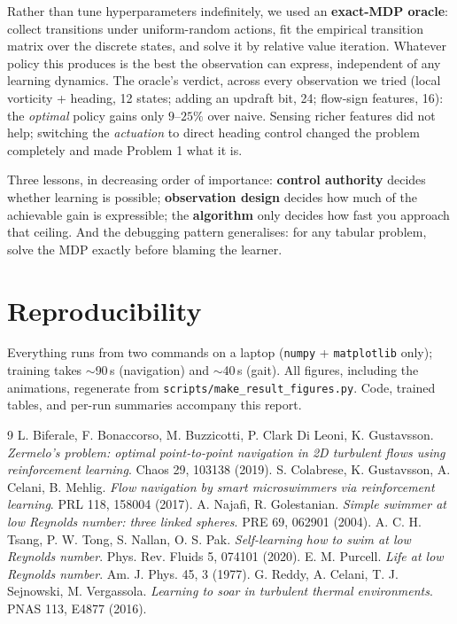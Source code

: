 \documentclass[11pt]{article}
\begin{document}
Rather than tune hyperparameters indefinitely, we used an \textbf{exact-MDP oracle}:
collect transitions under uniform-random actions, fit the empirical transition matrix
over the discrete states, and solve it by relative value iteration. Whatever policy this
produces is the best the observation can express, independent of any learning dynamics.
The oracle's verdict, across every observation we tried (local vorticity + heading, 12
states; adding an updraft bit, 24; flow-sign features, 16): the \emph{optimal} policy
gains only $9$--$25\%$ over naive. Sensing richer features did not help; switching the
\emph{actuation} to direct heading control changed the problem completely and made
Problem 1 what it is.

Three lessons, in decreasing order of importance: \textbf{control authority} decides
whether learning is possible; \textbf{observation design} decides how much of the
achievable gain is expressible; the \textbf{algorithm} only decides how fast you approach
that ceiling. And the debugging pattern generalises: for any tabular problem, solve the
MDP exactly before blaming the learner.

\section{Reproducibility}

Everything runs from two commands on a laptop (\texttt{numpy} + \texttt{matplotlib}
only); training takes $\sim$90\,s (navigation) and $\sim$40\,s (gait). All figures,
including the animations, regenerate from \texttt{scripts/make\_result\_figures.py}.
Code, trained tables, and per-run summaries accompany this report.

\begin{thebibliography}{9}
 L. Biferale, F. Bonaccorso, M. Buzzicotti, P. Clark Di Leoni,
K. Gustavsson. \emph{Zermelo's problem: optimal point-to-point navigation in 2D
turbulent flows using reinforcement learning}. Chaos 29, 103138 (2019).
 S. Colabrese, K. Gustavsson, A. Celani, B. Mehlig. \emph{Flow
navigation by smart microswimmers via reinforcement learning}. PRL 118, 158004 (2017).
 A. Najafi, R. Golestanian. \emph{Simple swimmer at low Reynolds number:
three linked spheres}. PRE 69, 062901 (2004).
 A. C. H. Tsang, P. W. Tong, S. Nallan, O. S. Pak. \emph{Self-learning
how to swim at low Reynolds number}. Phys. Rev. Fluids 5, 074101 (2020).
 E. M. Purcell. \emph{Life at low Reynolds number}. Am. J. Phys. 45, 3
(1977).
 G. Reddy, A. Celani, T. J. Sejnowski, M. Vergassola. \emph{Learning to
soar in turbulent thermal environments}. PNAS 113, E4877 (2016).
\end{thebibliography}
\end{document}
